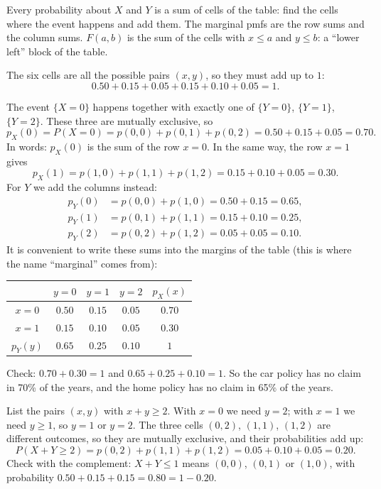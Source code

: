 \begin{solution}
	\idea Every probability about $X$ and $Y$ is a sum of cells of the table:
	find the cells where the event happens and add them. The marginal pmfs are
	the row sums and the column sums. $F(a,b)$ is the sum of the cells with
	$x\le a$ and $y\le b$: a ``lower left'' block of the table.

	 The six cells are all the possible pairs
	$(x,y)$, so they must add up to $1$:
	\[ 0.50+0.15+0.05+0.15+0.10+0.05=1. \]

	 The event $\{X=0\}$ happens together with exactly one of
	$\{Y=0\}$, $\{Y=1\}$, $\{Y=2\}$. These three are mutually exclusive, so
	\[ p_X(0)=P(X=0)=p(0,0)+p(0,1)+p(0,2)=0.50+0.15+0.05=0.70. \]
	In words: $p_X(0)$ is the sum of the row $x=0$. In the same way, the row
	$x=1$ gives
	\[ p_X(1)=p(1,0)+p(1,1)+p(1,2)=0.15+0.10+0.05=0.30. \]
	For $Y$ we add the columns instead:
	\[
		\begin{aligned}
			p_Y(0) & =p(0,0)+p(1,0)=0.50+0.15=0.65, \\
			p_Y(1) & =p(0,1)+p(1,1)=0.15+0.10=0.25, \\
			p_Y(2) & =p(0,2)+p(1,2)=0.05+0.05=0.10.
		\end{aligned}
	\]
	It is convenient to write these sums into the margins of the table (this
	is where the name ``marginal'' comes from):
	\begin{center}
		\begin{tabular}{c|ccc|c}
			          & $y=0$  & $y=1$  & $y=2$  & $p_X(x)$ \\ \hline
			$x=0$     & $0.50$ & $0.15$ & $0.05$ & $0.70$   \\
			$x=1$     & $0.15$ & $0.10$ & $0.05$ & $0.30$   \\ \hline
			$p_Y(y)$  & $0.65$ & $0.25$ & $0.10$ & $1$
		\end{tabular}
	\end{center}
	Check: $0.70+0.30=1$ and $0.65+0.25+0.10=1$. So the car policy has no
	claim in 70\% of the years, and the home policy has no claim in 65\% of
	the years.

	 List the pairs $(x,y)$ with $x+y\ge2$. With $x=0$ we need
	$y=2$; with $x=1$ we need $y\ge1$, so $y=1$ or $y=2$. The three cells
	$(0,2)$, $(1,1)$, $(1,2)$ are different outcomes, so they are mutually
	exclusive, and their probabilities add up:
	\[ P(X+Y\ge2)=p(0,2)+p(1,1)+p(1,2)=0.05+0.10+0.05=0.20. \]
	Check with the complement: $X+Y\le1$ means $(0,0)$, $(0,1)$ or $(1,0)$,
	with probability $0.50+0.15+0.15=0.80=1-0.20$.


\end{solution}
